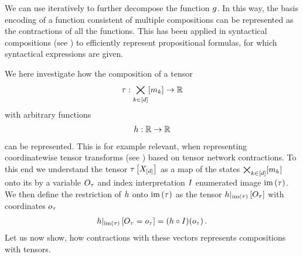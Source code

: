 We can use  iteratively to further decompose the function $g$.
In this way, the basis encoding of a function consistent of multiple compositions can be represented as the contractions of all the functions.
This has been applied in syntactical compositions (see ) to efficiently represent propositional formulas, for which syntactical expressions are given.


We here investigate how the composition of a tensor
\begin{align*}
    \tau : \bigtimes_{k\in[d]}[m_{k}] \rightarrow \mathbb{R}
\end{align*}
with arbitrary functions
\begin{align*}
    h: \mathbb{R} \rightarrow \mathbb{R}
\end{align*}
can be represented.
This is for example relevant, when representing coordinatewise tensor transforms (see ) based on tensor network contractions.
To this end we understand the tensor $\tau\left[X_{[d]}\right]$ as a map of the states $\bigtimes_{k\in[d]}[m_{k}]$ onto its by a variable $O_{\tau}$ and index interpretation $I$ enumerated image $\mathrm{im}\left(\tau\right)$.
We then define the restriction of $h$ onto $\mathrm{im}\left(\tau\right)$ as the tensor ${h}|_{\mathrm{im}\left(\tau\right)}\left[O_{\tau}\right]$ with coordinates $o_{\tau}$
\begin{align*}
    {h}|_{\mathrm{im}\left(\tau\right)}\left[O_{\tau}=o_{\tau}\right]
    = ({h}\circ{I})(o_{\tau}) \, .
\end{align*}
Let us now show, how contractions with these vectors represents compositions with tensors.

